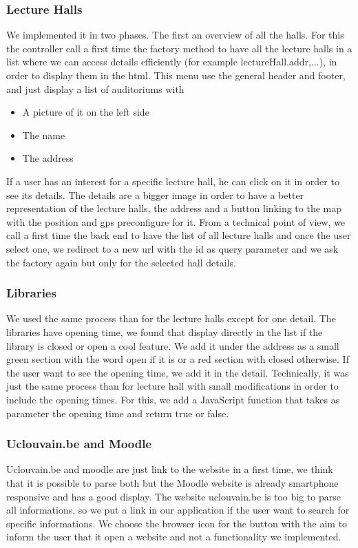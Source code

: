 \documentclass[11pt, a4paper]{report}
\begin{document}
\subsubsection{Lecture Halls}
We implemented it in two phases. The first an overview of all the halls. For this the controller call a first time the factory method to have all the lecture halls in a list where we can access details efficiently (for example lectureHall.addr,...), in order to display them in the html. This menu use the general header and footer, and just display a list of auditoriums with
\begin{itemize}
\item A picture of it on the left side
\item The name
\item The address
\end{itemize}
If a user has an interest for a specific lecture hall, he can click on it in order to see its details. The details are a bigger image in order to have a better representation of the lecture halls, the address and a button linking to the map with the position and gps preconfigure for it.
From a technical point of view, we call a first time the back end to have the list of all lecture halls and once the user select one, we redirect to a new url with the id as query parameter and we ask the factory again but only for the selected hall details.

\subsubsection{Libraries}
We used the same process than for the lecture halls except for one detail. The libraries have opening time, we found that display directly in the list if the library is closed or open a cool feature. We add it under the address as a small green section with the word open if it is or a red section with closed otherwise. If the user want to see the opening time, we add it in the detail. 
Technically, it was just the same process than for lecture hall with small modifications in order to include the opening times. For this, we add a JavaScript function that takes as parameter the opening time and return true or false.

\subsubsection{Uclouvain.be and Moodle}

Uclouvain.be and moodle are just link to the website in a first time, we think that it is possible to parse both but the Moodle website is already smartphone responsive and has a good display. The website uclouvain.be is too big to parse all informations, so we put a link in our application if the user want to search for specific informations. We choose the browser icon for the button with the aim to inform the user that it open a website and not a functionality we implemented. 
\end{document}
